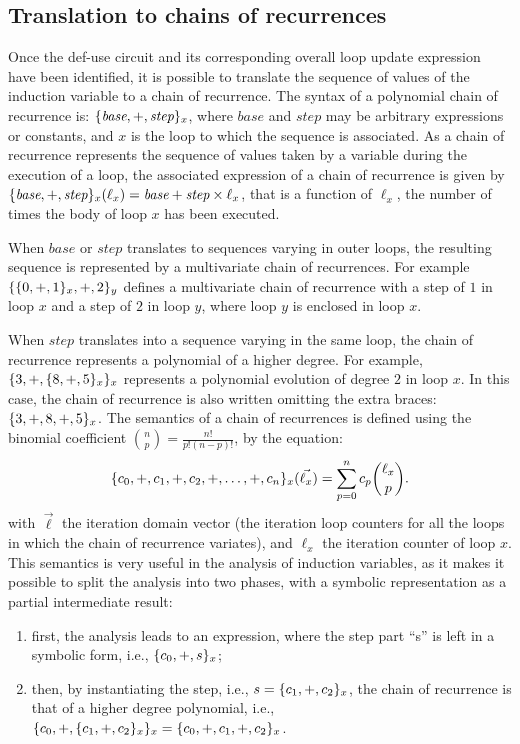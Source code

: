 \subsection{Translation to chains of recurrences}

Once the def-use circuit  and its corresponding overall loop
update expression have been identified, it is possible to translate the
sequence of values of the induction variable to a chain of recurrence.
The syntax of a polynomial chain of recurrence is: $\{\textit{base}, +,
  \textit{step}\}_x$, where $\textit{base}$ and $\textit{step}$ may be arbitrary expressions
or constants, and $x$ is the loop to which the sequence is
associated.  As a chain of recurrence represents the sequence of values
taken by a variable during the execution of a loop, the associated expression of a
chain of recurrence is given by $\{\textit{base}, +, \textit{step}\}_x (\ell_x) =
\textit{base} + \textit{step} \times \ell_x$, that is a function of $\ell_x$,
the number of times the body of loop $x$ has been executed.

When $base$ or $step$ translates to sequences varying in outer
loops, the resulting sequence is represented by a multivariate chain
of recurrences.  For example $\{\{0, +, 1\}_x, +, 2\}_y$
defines a multivariate chain of recurrence with a step of $1$ in loop
$x$ and a step of $2$ in loop $y$, where loop $y$ is enclosed in loop
$x$.

When $step$ translates into a sequence varying in the same loop, the
chain of recurrence represents a polynomial of a higher degree.  For
example, $\{3, +, \{8, +, 5\}_x\}_x$ represents a polynomial
evolution of degree $2$ in loop $x$.  In this case, the chain of
recurrence is also written omitting the extra braces: $\{3, +, 8,
  +, 5\}_x$.  The semantics of a chain of recurrences is defined using
the binomial coefficient $\binom{n}{p} = \frac{n!}{p!(n-p)!}$, by the
equation:
\begin{equation*}
  \{c_0,+,c_1,+,c_2,+,\ldots,+,c_n\}_x(\vec{\ell_x})=
  \sum_{p=0}^{n}c_{p}\binom{\ell_x}{p}.
\end{equation*}
with $\vec{\ell}$ the iteration domain vector (the iteration loop
counters for all the loops in which the chain of recurrence variates),
and $\ell_x$ the iteration counter of loop $x$.  This semantics is
very useful in the analysis of induction variables, as it makes it
possible to split the analysis into two phases, with a symbolic
representation as a partial intermediate result:
\begin{enumerate}
\item first, the analysis leads to an expression, where the step
  part ``s'' is left in a symbolic form, i.e., $\{c_0, +, s\}_x$;
\item then, by instantiating the step, i.e., $s = \{c_1, +,
  c_2\}_x$, the chain of recurrence is that of a higher degree
  polynomial, i.e., $\{c_0, +, \{c_1, +, c_2\}_x\}_x =
  \{c_0, +, c_1, +, c_2\}_x$.
\end{enumerate}

